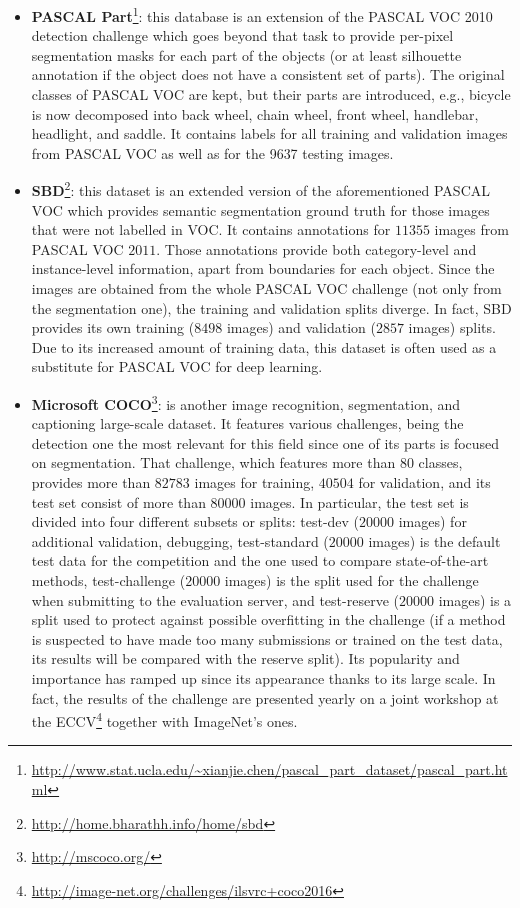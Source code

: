 \begin{itemize}
	\item \textbf{PASCAL Part}\cite{Chen2014}\footnote{\url{http://www.stat.ucla.edu/~xianjie.chen/pascal_part_dataset/pascal_part.html}}: this database is an extension of the PASCAL \ac{VOC} 2010 detection challenge which goes beyond that task to provide per-pixel segmentation masks for each part of the objects (or at least silhouette annotation if the object does not have a consistent set of parts). The original classes of PASCAL \ac{VOC} are kept, but their parts are introduced, e.g., bicycle is now decomposed into back wheel, chain wheel, front wheel, handlebar, headlight, and saddle. It contains labels for all training and validation images from PASCAL \ac{VOC} as well as for the 9637 testing images.
	\item \textbf{\acf{SBD}}\cite{Hariharan2011}\footnote{\url{http://home.bharathh.info/home/sbd}}: this dataset is an extended version of the aforementioned PASCAL \ac{VOC} which provides semantic segmentation ground truth for those images that were not labelled in \ac{VOC}. It contains annotations for $11355$ images from PASCAL \ac{VOC} $2011$. Those annotations provide both category-level and instance-level information, apart from boundaries for each object. Since the images are obtained from the whole PASCAL \ac{VOC} challenge (not only from the segmentation one), the training and validation splits diverge. In fact, \ac{SBD} provides its own training ($8498$ images) and validation ($2857$ images) splits. Due to its increased amount of training data, this dataset is often used as a substitute for PASCAL \ac{VOC} for deep learning.
	\item \textbf{Microsoft \acf{COCO}}\cite{Lin2014}\footnote{\url{http://mscoco.org/}}: is another image recognition, segmentation, and captioning large-scale dataset. It features various challenges, being the detection one the most relevant for this field since one of its parts is focused on segmentation. That challenge, which features more than $80$ classes, provides more than $82783$ images for training, $40504$ for validation, and its test set consist of more than $80000$ images. In particular, the test set is divided into four different subsets or splits: test-dev ($20000$ images) for additional validation, debugging, test-standard ($20000$ images) is the default test data for the competition and the one used to compare state-of-the-art methods, test-challenge ($20000$ images) is the split used for the challenge when submitting to the evaluation server, and test-reserve ($20000$ images) is a split used to protect against possible overfitting in the challenge (if a method is suspected to have made too many submissions or trained on the test data, its results will be compared with the reserve split). Its popularity and importance has ramped up since its appearance thanks to its large scale. In fact, the results of the challenge are presented yearly on a joint workshop at the \ac{ECCV}\footnote{\url{http://image-net.org/challenges/ilsvrc+coco2016}} together with ImageNet's ones.

\end{itemize}
